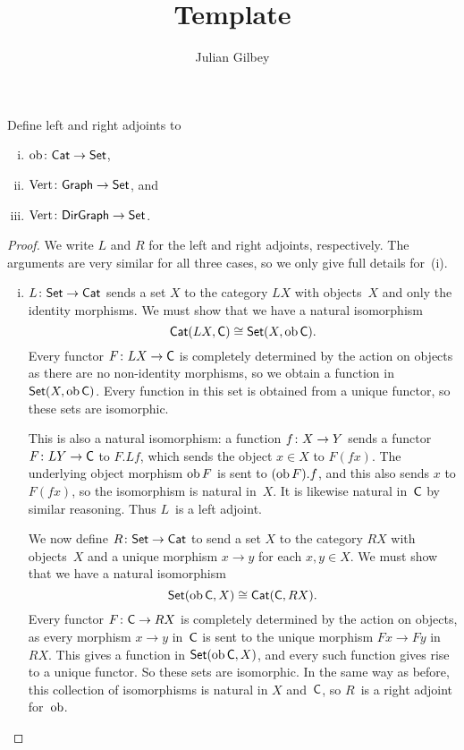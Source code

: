\documentclass[../../solutions]{subfiles}
\title{Template}
\author{Julian Gilbey}
\begin{document}
\maketitle

\begin{exercise}
  Define left and right adjoints to
  \begin{enumerate}[(i)]
  \item ${\operatorname{ob}}\colon{\textsf{Cat}}\to{\textsf{Set}}$,
  \item ${\text{Vert}}\colon{\textsf{Graph}}\to{\textsf{Set}}$, and
  \item ${\text{Vert}}\colon{\textsf{DirGraph}}\to{\textsf{Set}}$.
  \end{enumerate}
\end{exercise}

\begin{proof}
  We write $L$ and $R$ for the left and right adjoints, respectively.
  The arguments are very similar for all three cases, so we only give
  full details for~(i).

  \begin{enumerate}[(i)]
  \item ${L}\colon{\textsf{Set}}\to{\textsf{Cat}}$ sends a set $X$ to the category $LX$
    with objects~$X$ and only the identity morphisms.  We must show
    that we have a natural isomorphism
    $$\textsf{Cat}(LX, \mathsf{C}) \cong \textsf{Set}(X, \operatorname{ob}\mathsf{C}).$$
    Every functor ${F}\colon{LX}\to{\mathsf{C}}$ is completely determined by the
    action on objects as there are no non-identity morphisms, so we
    obtain a function in $\textsf{Set}(X, \operatorname{ob}\mathsf{C})$.  Every function in this
    set is obtained from a unique functor, so these sets are
    isomorphic.

    This is also a natural isomorphism: a function ${f}\colon{X}\to{Y}$
    sends a functor ${F}\colon{LY}\to{\mathsf{C}}$ to $F.Lf$, which sends the
    object $x\in X$ to $F(fx)$.  The underlying object morphism
    $\operatorname{ob} F$ is sent to $(\operatorname{ob} F).f$, and this also sends $x$ to
    $F(fx)$, so the isomorphism is natural in~$X$.  It is likewise
    natural in~$\mathsf{C}$ by similar reasoning.  Thus $L$~is a left
    adjoint.

    We now define ${R}\colon{\textsf{Set}}\to{\textsf{Cat}}$ to send a set $X$ to the
    category $RX$ with objects~$X$ and a unique morphism $x\to y$ for
    each $x,y\in X$.  We must show that we have a natural isomorphism
    $$\textsf{Set}(\operatorname{ob}\mathsf{C}, X) \cong \textsf{Cat}(\mathsf{C}, RX).$$
    Every functor ${F}\colon{\mathsf{C}}\to{RX}$ is completely determined by the
    action on objects, as every morphism $x\to y$ in~$\mathsf{C}$ is sent to
    the unique morphism $Fx\to Fy$ in~$RX$.  This gives a function in
    $\textsf{Set}(\operatorname{ob}\mathsf{C}, X)$, and every such function gives rise to a unique
    functor.  So these sets are isomorphic.  In the same way as
    before, this collection of isomorphisms is natural in $X$
    and~$\mathsf{C}$, so $R$~is a right adjoint for~$\operatorname{ob}$.


\end{enumerate}
\end{proof}
\end{document}
